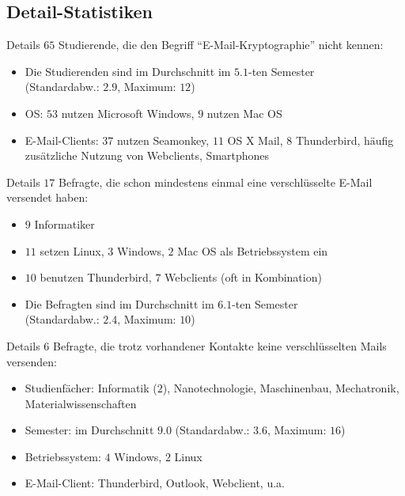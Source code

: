 \documentclass[]{beamer}
\begin{document}
\subsection*{Detail-Statistiken}
\begin{frame}{Details}
	$65$ Studierende, die den Begriff ``E-Mail-Kryptographie'' nicht kennen:
	\begin{itemize}
		\item Die Studierenden sind im Durchschnitt im $5.1$-ten Semester\\ (Standardabw.: $2.9$, Maximum: $12$)
		\item OS: $53$ nutzen Microsoft Windows, $9$ nutzen Mac OS
		\item E-Mail-Clients: $37$ nutzen Seamonkey, $11$ OS X Mail, $8$ Thunderbird, häufig zusätzliche Nutzung von Webclients, Smartphones
	\end{itemize}
\end{frame}

\begin{frame}{Details}
	$17$ Befragte, die schon mindestens einmal eine verschlüsselte E-Mail versendet haben:
	\begin{itemize}
		\item $9$ Informatiker
		\item $11$ setzen Linux, $3$ Windows, $2$ Mac OS als Betriebssystem ein
		\item $10$ benutzen Thunderbird, $7$ Webclients (oft in Kombination)
		\item Die Befragten sind im Durchschnitt im $6.1$-ten Semester\\(Standardabw.: $2.4$, Maximum: $10$)
	\end{itemize}
\end{frame}


\begin{frame}{Details}
	$6$ Befragte, die trotz vorhandener Kontakte keine verschlüsselten Mails versenden:
	\begin{itemize}
		\item Studienfächer: Informatik ($2$), Nanotechnologie, Maschinenbau, Mechatronik, Materialwissenschaften
		\item Semester: im Durchschnitt $9.0$ (Standardabw.: $3.6$, Maximum: $16$)
		\item Betriebssystem: $4$ Windows, $2$ Linux
		\item E-Mail-Client: Thunderbird, Outlook, Webclient, u.a.
	\end{itemize}
\end{frame}
\end{document}

